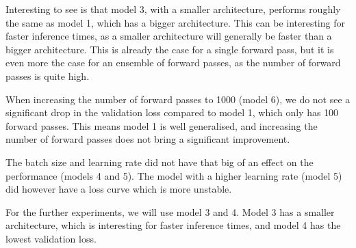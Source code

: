 Interesting to see is that model 3, with a smaller architecture, performs roughly the same as model 1, which has a bigger architecture.
This can be interesting for faster inference times, as a smaller architecture will generally be faster than a bigger architecture.
This is already the case for a single forward pass, but it is even more the case for an ensemble of forward passes, as the number of forward passes is quite high.

When increasing the number of forward passes to 1000 (model 6), we do not see a significant drop in the validation loss compared to model 1, which only has 100 forward passes.
This means model 1 is well generalised, and increasing the number of forward passes does not bring a significant improvement.

The batch size and learning rate did not have that big of an effect on the performance (models 4 and 5).
The model with a higher learning rate (model 5) did however have a loss curve which is more unstable.

For the further experiments, we will use model 3 and 4.
Model 3 has a smaller architecture, which is interesting for faster inference times, and model 4 has the lowest validation loss.